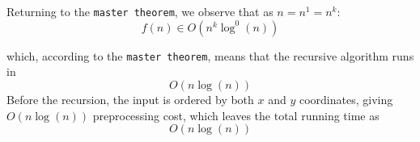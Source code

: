 \documentclass{tufte-handout}
\begin{document}
Returning to the \texttt{master theorem}, we observe that as $n = n^1 = n^k$:
$$f(n) \in O\left(n^k \log^0(n)\right)$$

which, according to the \texttt{master theorem}, means that the recursive algorithm runs
in $$O\left(n \log(n)\right)$$
Before the recursion, the input is ordered by both $x$ and $y$ coordinates,
giving $O(n \log(n))$ preprocessing cost, which leaves the total running time as
$$O\left(n \log(n)\right)$$
\end{document}
